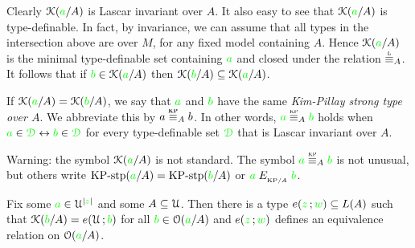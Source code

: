 \documentclass[creche.tex]{subfiles}
\begin{document}
Clearly $\EuScript K({\color{green} a}/A)$ is Lascar invariant over $A$.  It also easy to see that $\EuScript K({\color{green} a}/A)$ is type-definable. In fact, by invariance, we can assume that all types in the intersection above are over $M$, for any fixed model containing $A$. Hence $\EuScript K({\color{green} a}/A)$ is the minimal type-definable set containing ${\color{green} a}$ and closed under the relation $\equivL_A$. It follows that if ${\color{green} b}\in\EuScript K({\color{green} a}/A)$ then $\EuScript K({\color{green} b}/A)\subseteq\EuScript K({\color{green} a}/A)$. 

If $\EuScript K({\color{green} a}/A)=\EuScript K({\color{green} b}/A)$, we say that ${\color{green} a}$ and ${\color{green} b}$ have the same  \emph{Kim-Pillay strong type over $A$}. We abbreviate this by \emph{$a\stackrel{\smash{\scalebox{.5}{\rm\bf KP}}}{\equiv}_Ab$}. In other words, ${\gr a}\equivKP_A{\gr b}$ holds when ${\color{green} a}\in{\color{green}\EuScript D}\leftrightarrow{\color{green}b}\in{\color{green}\EuScript D}$ for every type-definable set ${\color{green}\EuScript D}$ that is Lascar invariant over $A$.


\noindent\llap{\textcolor{red}{\Large\danger}\kern1.5ex}Warning: the symbol $\EuScript K({\color{green} a}/A)$ is not standard. The symbol ${\gr a}\equivKP_A{\gr b}$ is not unusual, but others write ${\rm KP{\mbox{-}}stp}({\color{green} a}/A)={\rm KP{\mbox{-}}stp}({\color{green} b}/A)$ or ${\color{green} a}\mathrel{E_{_{{\rm KP}/A}}}{\color{green} b}$.

\begin{proposition}\label{prop_bardotto}
  Fix some ${\color{green} a}\in\EuScript U^{|{\color{green} z}|}$ and some $A\subseteq\EuScript U$. Then there is a type $e({\color{green} z}\,;{\color{green} w})\subseteq L(A)$ such that $\EuScript K({\color{green} b}/A)=e(\EuScript U\,;{\color{green} b})$ for all ${\color{green} b}\in\EuScript O({\color{green} a}/A)$ and $e({\color{green} z}\,;{\color{green} w})$ defines an equivalence relation on $\EuScript O({\color{green} a}/A)$.
\end{proposition}
\end{document}
